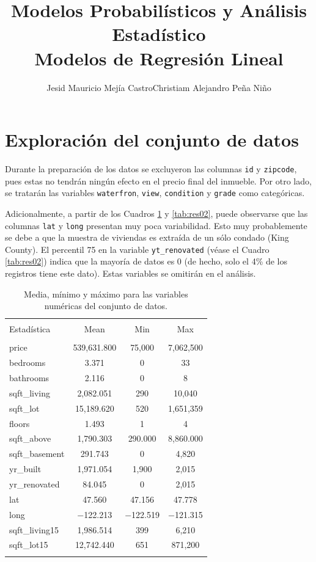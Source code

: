 \documentclass[10pt,letterpaper]{article}
\title{Modelos Probabilísticos y Análisis Estadístico\\Modelos de Regresión Lineal}
\author{Jesid Mauricio Mejía Castro\qquad\qquad Christiam Alejandro Peña Niño}
\begin{document}
\maketitle

\section{Exploración del conjunto de datos}
Durante la preparación de los datos se excluyeron las columnas \texttt{id} y \texttt{zipcode}, pues estas no tendrán ningún efecto en el precio final del inmueble. Por otro lado, se tratarán las variables \texttt{waterfron}, \texttt{view}, \texttt{condition} y \texttt{grade} como categóricas.

Adicionalmente, a partir de los Cuadros \ref{tab:res01} y \ref{tab:res02}, puede observarse que las columnas \texttt{lat} y \texttt{long} presentan muy poca variabilidad. Esto muy probablemente se debe a que la muestra de viviendas es extraída de un sólo condado (King County). El percentil 75 en la variable \texttt{yt\_renovated} (véase el Cuadro \ref{tab:res02}) indica que la mayoría de datos es 0 (de hecho, solo el 4\% de los registros tiene este dato). Estas variables se omitirán en el análisis.

\begin{table}[!htbp] \centering 
	\small 
	\begin{tabular}{@{\extracolsep{5pt}}lccc} 
		\\[-1.8ex]\hline 
		\hline \\[-1.8ex] 
		Estadística & \multicolumn{1}{c}{Mean} & \multicolumn{1}{c}{Min} & \multicolumn{1}{c}{Max} \\ 
		\hline \\[-1.8ex] 
		price & 539,631.800 & 75,000 & 7,062,500 \\ 
		bedrooms & 3.371 & 0 & 33 \\ 
		bathrooms & 2.116 & 0 & 8 \\ 
		sqft\_living & 2,082.051 & 290 & 10,040 \\ 
		sqft\_lot & 15,189.620 & 520 & 1,651,359 \\ 
		floors & 1.493 & 1 & 4 \\ 
		sqft\_above & 1,790.303 & 290.000 & 8,860.000 \\ 
		sqft\_basement & 291.743 & 0 & 4,820 \\ 
		yr\_built & 1,971.054 & 1,900 & 2,015 \\ 
		yr\_renovated & 84.045 & 0 & 2,015 \\ 
		lat & 47.560 & 47.156 & 47.778 \\ 
		long & $-$122.213 & $-$122.519 & $-$121.315 \\ 
		sqft\_living15 & 1,986.514 & 399 & 6,210 \\ 
		sqft\_lot15 & 12,742.440 & 651 & 871,200 \\ 
		\hline \\[-1.8ex] 
	\end{tabular} 
	\caption{Media, mínimo y máximo para las variables numéricas del conjunto de datos.} 
	\label{tab:res01} 
\end{table} 
\end{document}

